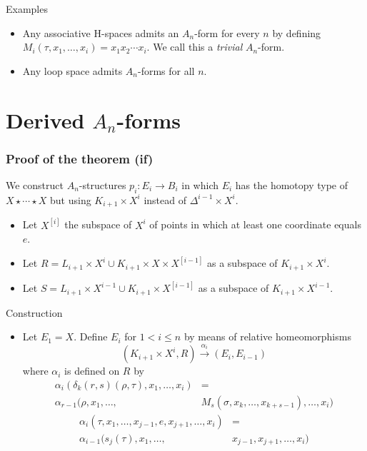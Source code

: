 \documentclass{beamer}
\theoremstyle{definition}
\begin{document}
\begin{frame}
\begin{block}{Examples}
\begin{itemize}
\item<1->Any associative H-spaces admits an $A_n$-form for every $n$ by defining $M_i(\tau,x_1,\dots,x_i)=x_1x_2\cdots x_i$. We call this a \emph{trivial} $A_n$-form.
\item<2-> Any loop space admits $A_n$-forms for all $n$.
\end{itemize}
\end{block}

\end{frame}


\section{Derived $A_n$-forms}

\begin{frame}
\frametitle{Proof of the theorem (if)}
We construct $A_n$-structures $p_i:E_i\to B_i$ in which $E_i$ has the homotopy type of $X\star\cdots\star X$ but using $K_{i+1}\times X^i$ instead of $\Delta^{i-1}\times X^i$.
\begin{itemize}
\item<2-> Let $X^{[i]}$ the subspace of $X^i$ of points in which at least one coordinate equals $e$.
\item<3-> Let $R=L_{i+1}\times X^i\cup K_{i+1}\times X\times X^{[i-1]}$ as a subspace of $K_{i+1}\times X^i$.
\item<4-> Let $S=L_{i+1}\times X^{i-1}\cup K_{i+1}\times X^{[i-1]}$ as a subspace of $K_{i+1}\times X^{i-1}$.
\end{itemize}
\end{frame}

\begin{frame}
\begin{block}{Construction}
\begin{itemize}
\item Let $E_1=X$. Define $E_i$ for $1<i\leq n$ by means of relative homeomorphisms %
\[
(K_{i+1}\times X^i,R)\xrightarrow{\alpha_i} (E_i,E_{i-1})
\]
where $\alpha_i$ is defined on $R$ by %
\begin{align*}
\alpha_i(\delta_k(r,s)(\rho,\tau),x_1,\dots,x_i)&=\\
\alpha_{r-1}(\rho,x_1,\dots,&M_s(\sigma,x_k,\dots, x_{k+s-1}),\dots, x_i)
\end{align*}
\begin{align*}
\alpha_i(\tau,x_1,\dots,x_{j-1},e,x_{j+1},\dots, x_i)&=\\
\alpha_{i-1}(s_j(\tau),x_1,\dots,& x_{j-1},x_{j+1},\dots, x_i)
\end{align*}
\end{itemize}
\end{block}
\end{frame}
\end{document}
